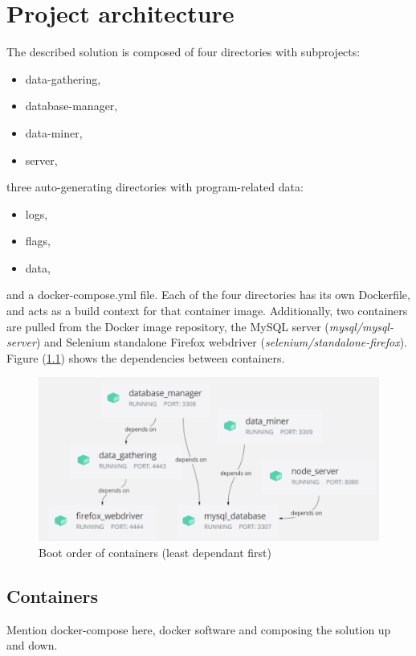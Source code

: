 \chapter{Project architecture}
\label{ch:architecture}
The described solution is composed of four directories with subprojects:
\begin{itemize}
\setlength\itemsep{0.2em}
\item data-gathering,
\item database-manager,
\item data-miner,
\item server,
\end{itemize}
three auto-generating directories with program-related data:
\begin{itemize}
\setlength\itemsep{0.2em}
\item logs,
\item flags,
\item data,
\end{itemize}
and a docker-compose.yml file. Each of the four directories has its own Dockerfile, and acts as a build context for that container image. Additionally, two containers are pulled from the Docker image repository, the MySQL server (\textit{mysql/mysql-server}) and Selenium standalone Firefox webdriver (\textit{selenium/standalone-firefox}).
Figure (\ref{arch:container_dependencies}) shows the dependencies between containers.

\begin{figure}[h!]
    \centering
    \includegraphics[width=\textwidth]{figures/container_dependencies.png}
    \caption{Boot order of containers (least dependant first)}
    \label{arch:container_dependencies}
\end{figure}

\section{Containers}
Mention docker-compose here, docker software and composing the solution up and down.

